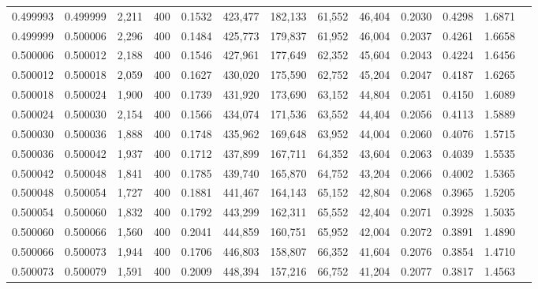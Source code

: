 \begin{tabular}{rrrrrrrrrrrrr}
0.499993 & 0.499999 & 2,211 & 400 &                                     0.1532 & 423,477 & 182,133 &  61,552 &  46,404 & 0.2030 & 0.4298 & 1.6871 \\
0.499999 & 0.500006 & 2,296 & 400 &                                     0.1484 & 425,773 & 179,837 &  61,952 &  46,004 & 0.2037 & 0.4261 & 1.6658 \\
0.500006 & 0.500012 & 2,188 & 400 &                                     0.1546 & 427,961 & 177,649 &  62,352 &  45,604 & 0.2043 & 0.4224 & 1.6456 \\
0.500012 & 0.500018 & 2,059 & 400 &                                     0.1627 & 430,020 & 175,590 &  62,752 &  45,204 & 0.2047 & 0.4187 & 1.6265 \\
0.500018 & 0.500024 & 1,900 & 400 &                                     0.1739 & 431,920 & 173,690 &  63,152 &  44,804 & 0.2051 & 0.4150 & 1.6089 \\
0.500024 & 0.500030 & 2,154 & 400 &                                     0.1566 & 434,074 & 171,536 &  63,552 &  44,404 & 0.2056 & 0.4113 & 1.5889 \\
0.500030 & 0.500036 & 1,888 & 400 &                                     0.1748 & 435,962 & 169,648 &  63,952 &  44,004 & 0.2060 & 0.4076 & 1.5715 \\
0.500036 & 0.500042 & 1,937 & 400 &                                     0.1712 & 437,899 & 167,711 &  64,352 &  43,604 & 0.2063 & 0.4039 & 1.5535 \\
0.500042 & 0.500048 & 1,841 & 400 &                                     0.1785 & 439,740 & 165,870 &  64,752 &  43,204 & 0.2066 & 0.4002 & 1.5365 \\
0.500048 & 0.500054 & 1,727 & 400 &                                     0.1881 & 441,467 & 164,143 &  65,152 &  42,804 & 0.2068 & 0.3965 & 1.5205 \\
0.500054 & 0.500060 & 1,832 & 400 &                                     0.1792 & 443,299 & 162,311 &  65,552 &  42,404 & 0.2071 & 0.3928 & 1.5035 \\
0.500060 & 0.500066 & 1,560 & 400 &                                     0.2041 & 444,859 & 160,751 &  65,952 &  42,004 & 0.2072 & 0.3891 & 1.4890 \\
0.500066 & 0.500073 & 1,944 & 400 &                                     0.1706 & 446,803 & 158,807 &  66,352 &  41,604 & 0.2076 & 0.3854 & 1.4710 \\
0.500073 & 0.500079 & 1,591 & 400 &                                     0.2009 & 448,394 & 157,216 &  66,752 &  41,204 & 0.2077 & 0.3817 & 1.4563 \\

\end{tabular}
